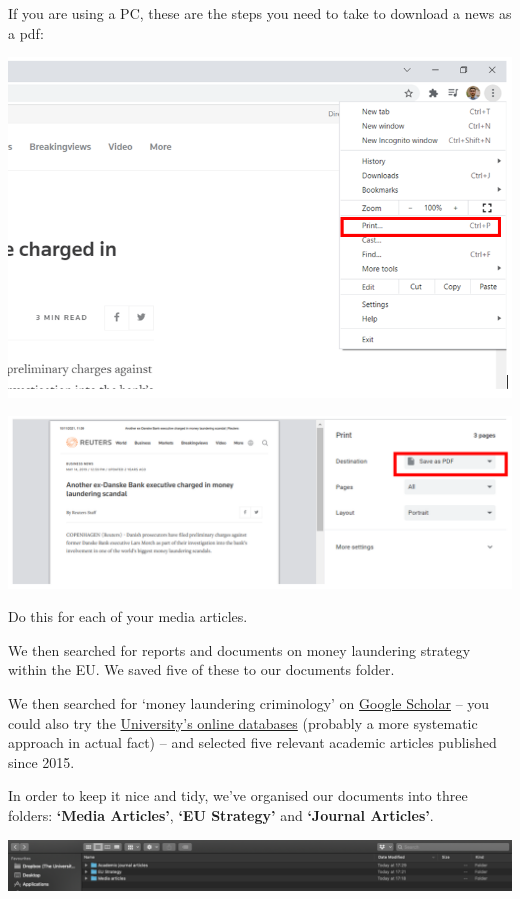 \documentclass[
]{book}
\begin{document}
If you are using a PC, these are the steps you need to take to download a news as a pdf:

\includegraphics{imgs/windows_print_1.png}

\includegraphics{imgs/windows_print_2.png}

Do this for each of your media articles.

We then searched for reports and documents on money laundering strategy within the EU. We saved five of these to our documents folder.

We then searched for `money laundering criminology' on \href{https://scholar.google.com/}{Google Scholar} -- you could also try the \href{https://www.librarysearch.manchester.ac.uk/}{University's online databases} (probably a more systematic approach in actual fact) -- and selected five relevant academic articles published since 2015.

In order to keep it nice and tidy, we've organised our documents into three folders: \textbf{`Media Articles'}, \textbf{`EU Strategy'} and \textbf{`Journal Articles'}.

\includegraphics{imgs/nice_tidy.png}
\end{document}
